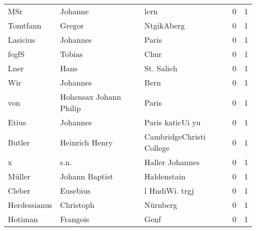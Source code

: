 \begin{center}
\begin{tiny}
\begin{longtabu}{llllrr}
                      MSr &                            Johanne &             &                                        lern &          0 &         1 \\
                 Tomtfann &                             Gregor &             &                                  NtgikAberg &          0 &         1 \\
                 Lasicius &                           Johannes &             &                                       Paris &          0 &         1 \\
                    fegfS &                             Tobias &             &                                        Chur &          0 &         1 \\
                     Lner &                               Hans &             &                                  St. Salieh &          0 &         1 \\
                      Wir &                           Johannes &             &                                        Bern &          0 &         1 \\
                      von &             Hohensax Johann Philip &             &                                       Paris &          0 &         1 \\
                    Etius &                           Johannes &             &                            Paris katicUi yu &          0 &         1 \\
                   Butler &                     Heinrich Henry &             &                    CambridgeChristi College &          0 &         1 \\
                        x &                               s.n. &             &                             Haller Johannes &          0 &         1 \\
                   Müller &                     Johann Baptist &             &                                 Haldenstain &          0 &         1 \\
                   Cleber &                           Eusebius &             &                              l HndiWi. trgj &          0 &         1 \\
             Herdessianus &                          Christoph &             &                                    Nürnberg &          0 &         1 \\
                  Hotiman &                           Frangois &             &                                        Genf &          0 &         1 \\

\end{longtabu}
\end{tiny}
\end{center}
